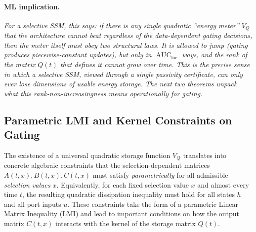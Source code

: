 \documentclass[10pt]{article} %
\newcommand{\loc}{\mathrm{loc}}                         %
\DeclareMathOperator{\AUC}{AUC}                         %
\theoremstyle{definition}
\begin{document}
\paragraph{ML implication.} \textit{For a selective SSM, this says: if there is any single quadratic ``energy meter'' $V_Q$ that the architecture cannot beat regardless of the data-dependent gating decisions, then the meter itself must obey two structural laws. It is allowed to jump (gating produces piecewise-constant updates), but only in $\AUC_{\loc}$ ways, and the rank of the matrix $Q(t)$ that defines it cannot grow over time. This is the precise sense in which a selective SSM, viewed through a single passivity certificate, can only ever lose dimensions of usable energy storage. The next two theorems unpack what this rank-non-increasingness means operationally for gating.}

\subsection{Parametric LMI and Kernel Constraints on Gating}
The existence of a universal quadratic storage function $V_Q$ translates into concrete algebraic constraints that the selection-dependent matrices $A(t,x), B(t,x), C(t,x)$ must satisfy \emph{parametrically} for all admissible \emph{selection values} $x$. Equivalently, for each fixed selection value $x$ and almost every time $t$, the resulting quadratic dissipation inequality must hold for all states $h$ and all port inputs $u$. These constraints take the form of a parametric Linear Matrix Inequality (LMI) and lead to important conditions on how the output matrix $C(t,x)$ interacts with the kernel of the storage matrix $Q(t)$.
\end{document}
